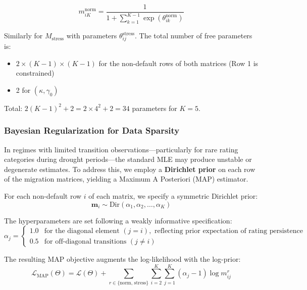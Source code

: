 \documentclass[12pt,a4paper]{article}
\newcommand{\Mstress}{M_{\text{stress}}}
\begin{document}
\begin{equation}
m_{iK}^{\text{norm}} = \frac{1}{1 + \sum_{k=1}^{K-1} \exp(\theta_{ik}^{\text{norm}})}
\end{equation}

Similarly for $\Mstress$ with parameters $\theta_{ij}^{\text{stress}}$. The total number of free parameters is:
\begin{itemize}[noitemsep]
    \item $2 \times (K-1) \times (K-1)$ for the non-default rows of both matrices (Row 1 is constrained)
    \item 2 for $(\kappa, \gamma_0)$
\end{itemize}

Total: $2(K-1)^2 + 2 = 2 \times 4^2 + 2 = 34$ parameters for $K=5$.

\subsubsection{Bayesian Regularization for Data Sparsity}

In regimes with limited transition observations---particularly for rare rating categories during drought periods---the standard MLE may produce unstable or degenerate estimates. To address this, we employ a \textbf{Dirichlet prior} on each row of the migration matrices, yielding a Maximum A Posteriori (MAP) estimator.

For each non-default row $i$ of each matrix, we specify a symmetric Dirichlet prior:
\begin{equation}
\boldsymbol{m}_i \sim \text{Dir}(\alpha_1, \alpha_2, \ldots, \alpha_K)
\end{equation}

The hyperparameters are set following a weakly informative specification:
\begin{equation}
\alpha_j = \begin{cases} 1.0 & \text{for the diagonal element } (j = i), \text{ reflecting prior expectation of rating persistence} \\ 0.5 & \text{for off-diagonal transitions } (j \neq i) \end{cases}
\end{equation}

The resulting MAP objective augments the log-likelihood with the log-prior:
\begin{equation}
\mathcal{L}_{\text{MAP}}(\Theta) = \mathcal{L}(\Theta) + \sum_{r \in \{\text{norm, stress}\}} \sum_{i=2}^{K} \sum_{j=1}^{K} (\alpha_j - 1) \log m_{ij}^{r}
\end{equation}
\end{document}
